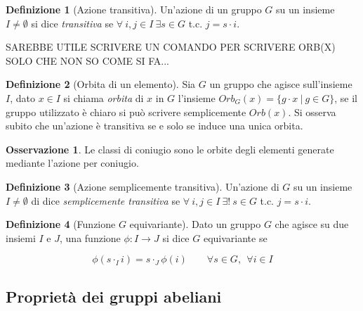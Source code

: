 \documentclass[11pt]{article}
\theoremstyle{plain}
\theoremstyle{definition}
\newtheorem{defn}{Definizione}[section]
\newtheorem*{rem}{Osservazione}
\theoremstyle{remark}
\begin{document}
\begin{defn}[Azione transitiva]
Un'azione di un gruppo $G$ su un insieme $I\neq \emptyset$ si dice \textit{transitiva} se $\forall\ i,j\in I\ \exists s\in G$ t.c. $j=s\cdot i$.
\label{defn:azione transitiva}
\end{defn}

SAREBBE UTILE SCRIVERE UN COMANDO PER SCRIVERE ORB(X) SOLO CHE NON SO COME SI FA...
\begin{defn}[Orbita di un elemento]
Sia $G$ un gruppo che agisce sull'insieme $I$, dato $x\in I$ si chiama \textit{orbita} di $x$ in $G$ l'insieme $Orb_{G}(x)=\{ g\cdot x\ |\ g\in G \}$, se il gruppo utilizzato è chiaro si può scrivere semplicemente $Orb(x)$. Si osserva subito che un'azione è transitiva se e solo se induce una unica orbita.
\label{defn:orbita}
\end{defn}
\begin{rem}
	Le classi di coniugio sono le orbite degli elementi generate mediante l'azione per coniugio.
\end{rem}




\begin{defn}[Azione semplicemente transitiva]
Un'azione di $G$ su un insieme $I\neq \emptyset$ di dice \textit{semplicemente transitiva} se $\forall\ i,j\in I\ \exists !\ s\in G$ t.c. $j=s\cdot i$.
\end{defn}


\begin{defn}[Funzione $G$ equivariante]

Dato un gruppo $G$ che agisce su due insiemi $I$ e $J$, una funzione $\phi: I \to J$ si dice $G$ equivariante se 

\[ \phi(s \cdot_I i) = s \cdot_J \phi(i) \qquad \forall s \in G, \ \ \forall i \in I \]


\end{defn}


















\newpage
\subsection{Proprietà dei gruppi abeliani}
\end{document}
